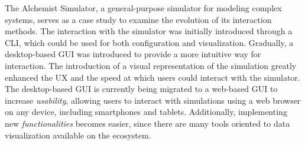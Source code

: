 \documentclass[conference]{IEEEtran}
\begin{document}
The Alchemist Simulator,
a general-purpose simulator for modeling complex systems,
serves as a case study to examine the evolution of its interaction methods.
%
The interaction with the simulator was initially introduced through a \ac{CLI},
which could be used for both configuration and visualization.
%
Gradually,
a desktop-based \ac{GUI} was introduced to provide a more intuitive way for interaction.
%
The introduction of a visual representation of the simulation greatly enhanced the \ac{UX} and the speed at which users could interact with the simulator.
%
The desktop-based \ac{GUI} is currently being migrated to a web-based \ac{GUI} to increase \emph{usability},
allowing users to interact with simulations using a web browser on any device,
including smartphones and tablets.
%
Additionally,
implementing new \emph{functionalities} becomes easier,
since there are many tools oriented to data visualization available on the ecosystem.
%
\end{document}
